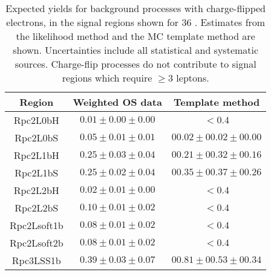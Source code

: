 \begin{table}[!htb]
\caption{Expected yields for background processes with charge-flipped electrons,
in the signal regions shown for 36 \ifb. 
Estimates from the likelihood method and the MC template method are shown.
Uncertainties include all statistical and systematic sources. 
Charge-flip processes do not contribute to signal regions which require $\ge 3$ leptons. 
}
\label{tab:chflips_sr_yields}
\centering
\begin{tabular}{|c||c|c|}\hline
 Region      &   Weighted OS data          &     Template method \\\hline
    Rpc2L0bH & $ 0.01 \pm  0.00 \pm  0.00$ & $<0.4$ \\
    Rpc2L0bS & $ 0.05 \pm  0.01 \pm  0.01$ & $ 00.02 \pm 00.02 \pm 00.00 $ \\
    Rpc2L1bH & $ 0.25 \pm  0.03 \pm  0.04$ & $ 00.21 \pm 00.32 \pm 00.16 $ \\
    Rpc2L1bS & $ 0.25 \pm  0.02 \pm  0.04$ & $ 00.35 \pm 00.37 \pm 00.26 $ \\
    Rpc2L2bH & $ 0.02 \pm  0.01 \pm  0.00$ & $<0.4$ \\
    Rpc2L2bS & $ 0.10 \pm  0.01 \pm  0.02$ & $<0.4$ \\
 Rpc2Lsoft1b & $ 0.08 \pm  0.01 \pm  0.02$ & $<0.4$ \\
 Rpc2Lsoft2b & $ 0.08 \pm  0.01 \pm  0.02$ & $<0.4$ \\
   Rpc3LSS1b & $ 0.39 \pm  0.03 \pm  0.07$ & $ 00.81 \pm 00.53 \pm 00.34 $ \\
\hline
\hline
\end{tabular}
\end{table}


\begin{table}[!htb]
\caption{Comparison of expected yields for background processes with fake leptons,
in the validation regions, shown for 36 \ifb~between the data driven (DD) estimates and the MC template method (MC) estimates. 
}
\label{tab:VR_Comparison}
\def\arraystretch{1.1}
\centering
{}
\end{table}
